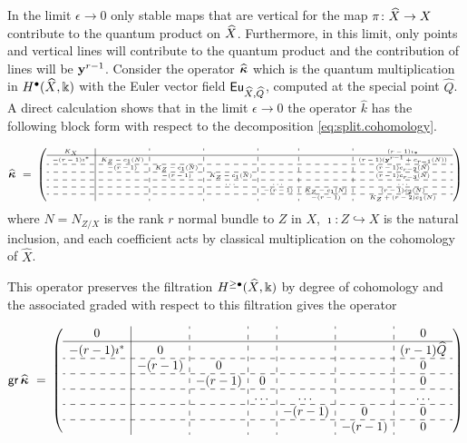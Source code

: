 \documentclass[twoside,leqno]{article}
\numberwithin{equation}{section}
\theoremstyle{plain}
\theoremstyle{definition}
\begin{document}
\medskip


In the limit $\epsilon \to 0$ only stable maps that are vertical 
for the map $\pi \colon \widehat{X} \to X$ contribute to the  quantum product on $\widehat{X}$. 
Furthermore, in this limit, only points and vertical lines will contribute to the quantum product and the contribution of lines will be $\mathbf{y}^{r-1}$.   
Consider the operator $\widehat{\boldsymbol{\kappa}}$ which is the quantum multiplication in $H^{\bullet}(\widehat{X},\Bbbk)$ with the Euler vector field $\operatorname{\mathsf{Eu}}_{\widehat{X},\widehat{Q}}$, computed at the special point $\widehat{Q}$.  A direct calculation shows that in the limit $\epsilon \to 0$ the operator $\widehat{k}$ has the following  block form  with respect to the decomposition \eqref{eq:split.cohomology}.

\[\tiny
\text{\normalsize $\widehat{\bkappa} \ = \ $} \left(\begin{array}{c|c:c:c:c:c:c}
K_X&&&& &&(r-1)\imath_*\\
\hline -(r-1)\imath^*& K_Z-c_1(N)&&&&& (r-1)(\fy^{r-1}+c_{r-1}(N))\\
\hdashline & -(r-1) &K_Z-c_1(N)&&& &(r-1)c_{r-2}(N)\\
\hdashline && -(r-1) &K_Z-c_1(N)&&& (r-1)c_{r-3}(N)\\
\hdashline &&&\dots  &\dots& &\dots\\
\hdashline &&&&-(r-1)& K_Z-c_1(N) &(r-1) c_2(N)\\
\hdashline &&&& &-(r-1)&K_Z+(r-2)c_1(N)\end{array}\right)
\]
\noindent where $N = N_{Z/X}$ is the rank $r$  normal bundle to $Z$ in $X$, $\imath\colon Z \hookrightarrow X$ is the natural inclusion, and each coefficient acts by classical multiplication on the cohomology of $\widehat{X}$.

\medskip


This operator preserves the filtration $H^{\geq \bullet}(\widehat{X},\Bbbk)$ by degree of cohomology and the associated graded with respect to this filtration  gives the operator


{\tiny
\[
\text{\normalsize $\mathsf{gr} \, \widehat{\bkappa} \ = \ $} 
\left(\begin{array}{c|c:c:c:c:c:c}
0&&&&&& 0\\
\hline
-(r-1)\imath^{*} & 0 &&&&& (r-1)\widehat{Q}\\
 \hdashline
 & -(r-1) & 0 &&& & 0 \\
\hdashline && -(r-1) & 0 &&& 0 \\
\hdashline &&&\dots  &\dots& &\dots\\
\hdashline &&&&-(r-1)& 0 & 0\\
\hdashline &&&& &-(r-1)& 0\end{array}\right)
\]
}
\end{document}
